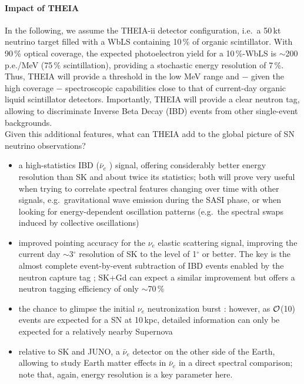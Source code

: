 \paragraph{Impact of THEIA} In the following, we assume the THEIA-ii detector configuration, i.e.~a 50\,kt neutrino target filled with a WbLS containing 10\,\% of organic scintillator. With 90\,\% optical coverage, the expected photoelectron yield for a 10\,\%-WbLS is $\sim$200\,p.e./MeV (75\,\% scintillation), providing a stochastic energy resolution of 7\,\%. Thus, THEIA will provide a threshold in the low MeV range and $-$ given the high coverage $-$ spectroscopic capabilities close to that of current-day organic liquid scintillator detectors. Importantly, THEIA will provide a clear neutron tag, allowing to discriminate Inverse Beta Decay (IBD) events from other single-event backgrounds.
\medskip\\
Given this additional features, what can THEIA add to the global picture of SN neutrino observations? 
\begin{itemize}
\item a high-statistics IBD ($\bar\nu_e$ ) signal, offering considerably better energy resolution than SK and about twice its statistics; both will prove very useful when trying to correlate spectral features changing over time with other signals, e.g.~gravitational wave emission during the SASI phase, or when looking for energy-dependent oscillation patterns (e.g.~the spectral swaps induced by collective oscillations)
\item improved pointing accuracy for the $\nu_e$ elastic scattering signal, improving the current day $\sim$3$^\circ$ resolution of SK to the level of 1$^\circ$ or better. The key is the almost complete event-by-event subtraction of IBD events enabled by the neutron capture tag \cite{Tomas:2003xn}; SK+Gd can expect a similar improvement but offers a neutron tagging efficiency of only $\sim$70\,\%
\item the chance to glimpse the initial $\nu_e$ neutronization burst \cite{Kachelriess:2004ds}: however, as $\cal O$(10) events are expected for a SN at 10\,kpc, detailed information can only be expected for a relatively nearby Supernova
\item relative to SK and JUNO, a $\bar\nu_e$ detector on the other side of the Earth, allowing to study Earth matter effects in $\bar\nu_e$ in a direct spectral comparison; note that, again, energy resolution is a key parameter here.
\end{itemize}

